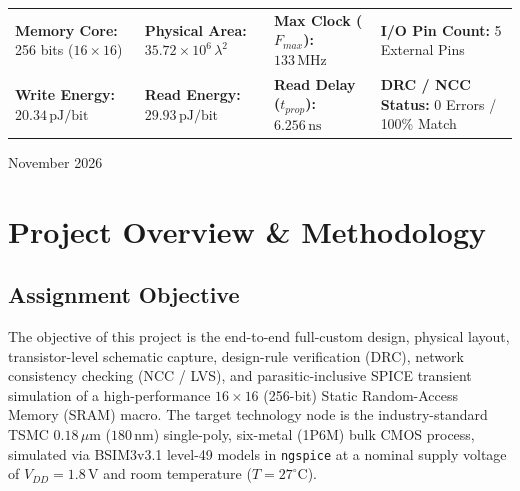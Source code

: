 \documentclass[10pt,a4paper,titlepage]{article}
\begin{document}
\begin{titlepage}
    \vfill
    
    \begin{metricbox}[title=Executive Summary of Verified Performance Achievements]
        \centering\small\sffamily
        \begin{tabularx}{\textwidth}{XXXX}
            \textbf{Memory Core:} 256 bits ($16\times 16$) & \textbf{Physical Area:} $35.72\times 10^6\,\lambda^2$ & \textbf{Max Clock ($F_{max}$):} $133\,\text{MHz}$ & \textbf{I/O Pin Count:} 5 External Pins\\
            \textbf{Write Energy:} $20.34\,\text{pJ/bit}$ & \textbf{Read Energy:} $29.93\,\text{pJ/bit}$ & \textbf{Read Delay ($t_{prop}$):} $6.256\,\text{ns}$ & \textbf{DRC / NCC Status:} 0 Errors / 100\% Match
        \end{tabularx}
    \end{metricbox}
    
    \vspace{0.8cm}
    {\large\sffamily November 2026}
\end{titlepage}

\tableofcontents
\newpage

\section{Project Overview \& Methodology}

\subsection{Assignment Objective}
The objective of this project is the end-to-end full-custom design, physical layout, transistor-level schematic capture, design-rule verification (DRC), network consistency checking (NCC / LVS), and parasitic-inclusive SPICE transient simulation of a high-performance $16 \times 16$ (256-bit) Static Random-Access Memory (SRAM) macro. The target technology node is the industry-standard TSMC $0.18\,\mu\text{m}$ ($180\,\text{nm}$) single-poly, six-metal (1P6M) bulk CMOS process, simulated via BSIM3v3.1 level-49 models in \texttt{ngspice} at a nominal supply voltage of $V_{DD} = 1.8\,\text{V}$ and room temperature ($T = 27^\circ\text{C}$).
\end{document}
